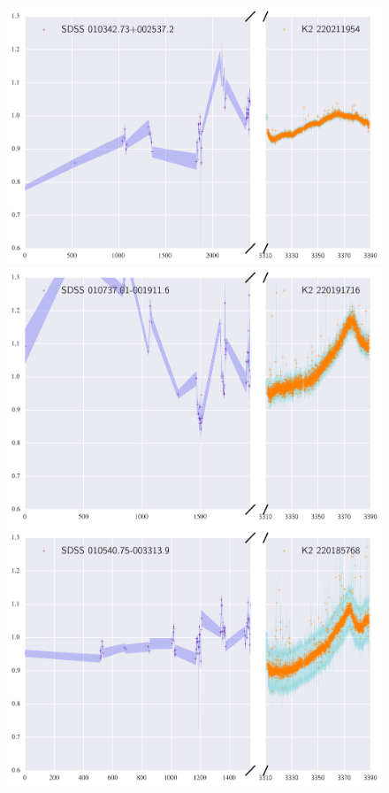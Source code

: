 \documentclass[a4paper,fleqn,usenatbib]{mnras}
\begin{document}
          \begin{figure}
  	\includegraphics[width=\columnwidth]{220211954ExtendedLC.png}
  	\includegraphics[width=\columnwidth]{220191716ExtendedLC.png}
  	\includegraphics[width=\columnwidth]{220185768ExtendedLC.png}
          	\caption{}
          	\label{fig:example_figure}
          \end{figure}          
          
\end{document}
